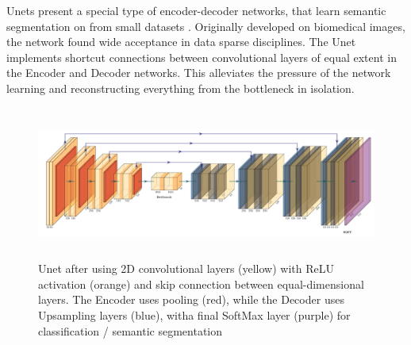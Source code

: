 Unets present a special type of encoder-decoder networks, that learn semantic segmentation on from small datasets \citep{ronneberger2015unet}. Originally developed on biomedical images, the network found wide acceptance in data sparse disciplines. The Unet implements shortcut connections between convolutional layers of equal extent in the Encoder and Decoder networks. This alleviates the pressure of the network learning and reconstructing everything from the bottleneck in isolation. 

\begin{figure}
    \centering
    \includegraphics[width=\textwidth,height=5cm,keepaspectratio]{figures/unet.pdf}
    \caption{Unet after \citet{ronneberger2015unet} using 2D convolutional layers (yellow) with ReLU activation (orange) and skip connection between equal-dimensional layers. The Encoder uses pooling (red), while the Decoder uses Upsampling layers (blue), witha final SoftMax layer (purple) for classification / semantic segmentation}
    \label{fig:unet}
\end{figure}